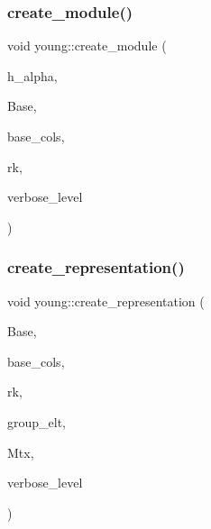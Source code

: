 \subsubsection{\texorpdfstring{create\+\_\+module()}{create\_module()}}
{\footnotesize\ttfamily void young\+::create\+\_\+module (\begin{DoxyParamCaption}\item[{\mbox{\hyperlink{galois_8h_a09fddde158a3a20bd2dcadb609de11dc}{I\+NT}} $\ast$}]{h\+\_\+alpha,  }\item[{\mbox{\hyperlink{galois_8h_a09fddde158a3a20bd2dcadb609de11dc}{I\+NT}} $\ast$\&}]{Base,  }\item[{\mbox{\hyperlink{galois_8h_a09fddde158a3a20bd2dcadb609de11dc}{I\+NT}} $\ast$\&}]{base\+\_\+cols,  }\item[{\mbox{\hyperlink{galois_8h_a09fddde158a3a20bd2dcadb609de11dc}{I\+NT}} \&}]{rk,  }\item[{\mbox{\hyperlink{galois_8h_a09fddde158a3a20bd2dcadb609de11dc}{I\+NT}}}]{verbose\+\_\+level }\end{DoxyParamCaption})}

\mbox{\label{classyoung_ad6c7168dc7b9afc75701b9563b24a0a5}} 
\subsubsection{\texorpdfstring{create\+\_\+representation()}{create\_representation()}}
{\footnotesize\ttfamily void young\+::create\+\_\+representation (\begin{DoxyParamCaption}\item[{\mbox{\hyperlink{galois_8h_a09fddde158a3a20bd2dcadb609de11dc}{I\+NT}} $\ast$}]{Base,  }\item[{\mbox{\hyperlink{galois_8h_a09fddde158a3a20bd2dcadb609de11dc}{I\+NT}} $\ast$}]{base\+\_\+cols,  }\item[{\mbox{\hyperlink{galois_8h_a09fddde158a3a20bd2dcadb609de11dc}{I\+NT}}}]{rk,  }\item[{\mbox{\hyperlink{galois_8h_a09fddde158a3a20bd2dcadb609de11dc}{I\+NT}}}]{group\+\_\+elt,  }\item[{\mbox{\hyperlink{galois_8h_a09fddde158a3a20bd2dcadb609de11dc}{I\+NT}} $\ast$}]{Mtx,  }\item[{\mbox{\hyperlink{galois_8h_a09fddde158a3a20bd2dcadb609de11dc}{I\+NT}}}]{verbose\+\_\+level }\end{DoxyParamCaption})}

